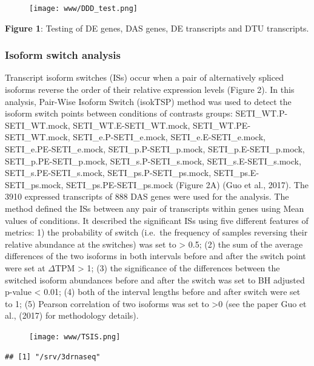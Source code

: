 \documentclass[]{article}
\begin{document}
\begin{figure}[htbp]
\centering
\texttt{[image: www/DDD\_test.png]}
\caption{}
\end{figure}

\textbf{Figure 1}: Testing of DE genes, DAS genes, DE transcripts and
DTU transcripts.

\subsubsection{Isoform switch analysis}\label{isoform-switch-analysis}

Transcript isoform switches (ISs) occur when a pair of alternatively
spliced isoforms reverse the order of their relative expression levels
(Figure 2). In this analysis, Pair-Wise Isoform Switch (isokTSP) method
was used to detect the isoform switch points between conditions of
contrasts groups: SETI\_WT.P-SETI\_WT.mock, SETI\_WT.E-SETI\_WT.mock,
SETI\_WT.PE-SETI\_WT.mock, SETI\_e.P-SETI\_e.mock,
SETI\_e.E-SETI\_e.mock, SETI\_e.PE-SETI\_e.mock, SETI\_p.P-SETI\_p.mock,
SETI\_p.E-SETI\_p.mock, SETI\_p.PE-SETI\_p.mock, SETI\_s.P-SETI\_s.mock,
SETI\_s.E-SETI\_s.mock, SETI\_s.PE-SETI\_s.mock,
SETI\_ps.P-SETI\_ps.mock, SETI\_ps.E-SETI\_ps.mock,
SETI\_ps.PE-SETI\_ps.mock (Figure 2A) (Guo et al., 2017). The 3910
expressed transcripts of 888 DAS genes were used for the analysis. The
method defined the ISs between any pair of transcripts within genes
using Mean values of conditions. It described the significant ISs using
five different features of metrics: 1) the probability of switch
(i.e.~the frequency of samples reversing their relative abundance at the
switches) was set to \textgreater{} 0.5; (2) the sum of the average
differences of the two isoforms in both intervals before and after the
switch point were set at \(\Delta\)TPM \textgreater{} 1; (3) the
significance of the differences between the switched isoform abundances
before and after the switch was set to BH adjusted p-value \textless{}
0.01; (4) both of the interval lengths before and after switch were set
to 1; (5) Pearson correlation of two isoforms was set to \textgreater{}0
(see the paper Guo et al., (2017) for methodology details).

\begin{figure}[htbp]
\centering
\texttt{[image: www/TSIS.png]}
\caption{}
\end{figure}

\begin{verbatim}
## [1] "/srv/3drnaseq"
\end{verbatim}
\end{document}
